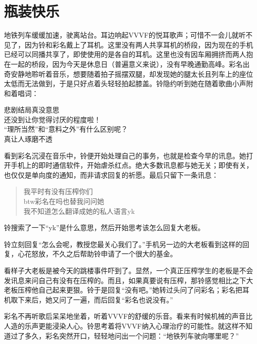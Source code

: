 \chapter{瓶装快乐}

地铁列车缓缓加速，驶离站台。耳边响起VVVF的悦耳歌声；可惜不一会儿就听不见了，因为铃和彩名戴上了耳机。这里没有两人共享耳机的桥段，因为现在的手机已经可以同播共享了，即使使用的是各自的耳机。这里也没有因车厢拥挤而两人抱在一起的桥段，因为今天是休息日（普遍意义来说），没有早晚通勤高峰。彩名出奇安静地聆听着音乐，想要随着拍子摇摆双腿，却发现她的腿太长且列车上的座位太低而无法做到，于是只好点着头轻轻拍起膝盖。铃隐约听到她在随着歌曲小声附和着唱词：
\begin{song}
悲剧结局真没意思\\
还没到让你觉得讨厌的程度啦！\\
“理所当然”和“意料之外”有什么区别呢？\\
真让人琢磨不透
\end{song}

看到彩名沉浸在音乐中，铃便开始处理自己的事务，也就是检查今早的讯息。她打开手机上的即时通信软件，开始虐杀红点。绝大多数讯息都与她无关；即使有关，也仅仅是单向度的通知，而非请求回复的祈愿。最后只留下一条讯息：
\begin{quote}
 我平时有没有压榨你们\\
 btw彩名在吗也替我问问她\\
 我不知道怎么翻译成她的私人语言yk
\end{quote}

铃搜索了一下“yk”是什么意思，然后开始思考该怎么回复大老板。

\begin{branch}
\gutend 铃立刻回复“怎么会呢，教授您最关心我们了。”手机另一边的大老板看到这样的回复，心花怒放，不久之后帮助铃申请了一个很大的基金。
\end{branch}

看样子大老板是被今天的跳楼事件吓到了。显然，一个真正压榨学生的老板是不会发讯息来问自己有没有在压榨的。而且，如果真要说有压榨，那铃感觉相比之下大老板压榨他自己起来更狠。铃于是回复“没有吧。”她转过头问了问彩名；彩名把耳机取下来后，她又问了一遍，而后回复“彩名也说没有。”

彩名不再听歌后呆呆地坐着，听着VVVF的舒缓的乐音。看来有时候机械的声音比人造的乐声更能浸染人心。铃思考着将VVVF纳入心理治疗的可能性。就这样不知道过了多久，彩名突然开口，轻轻地问出一个问题：“地铁列车驶向哪里呢？”

